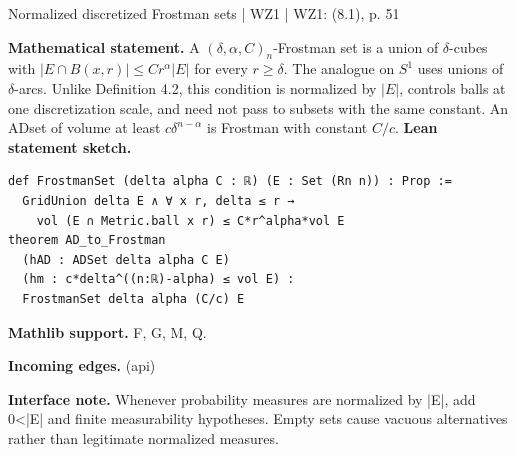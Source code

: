 \documentclass[10pt,a4paper]{article}
\newcommand{\nodecard}[1]{\hyperlink{node-#1}{\texttt{\detokenize{#1}}}}
\begin{document}
\begin{minipage}{\linewidth}
\hypertarget{node-DFrost}{}
\begin{tcolorbox}[colback=white,colframe=radialfg,colbacktitle=radialbg,coltitle=ink,boxrule=0.45pt,arc=1.6mm,left=3mm,right=3mm,top=2mm,bottom=2mm,title={\sffamily\bfseries WZ1 Definition 8.1 \hfill \texttt{DFrost}}]
{\sffamily\small\color{muted}Normalized discretized Frostman sets | WZ1 | WZ1: (8.1), p. 51}\par
\textbf{Mathematical statement.} A $(\delta,\alpha,C)_n$-Frostman set is a union of $\delta$-cubes with
$|E\cap B(x,r)|\le Cr^\alpha |E|$ for every $r\ge\delta$.
The analogue on $S^1$ uses unions of $\delta$-arcs. Unlike Definition 4.2, this condition is normalized by $|E|$, controls balls at one discretization scale, and need not pass to subsets with the same constant.
An ADset of volume at least $c\delta^{n-\alpha}$ is Frostman with constant $C/c$.
\smallskip\textbf{Lean statement sketch.}
\begin{Verbatim}[fontsize=\small,breaklines=true,breakanywhere=true,tabsize=2]
def FrostmanSet (delta alpha C : ℝ) (E : Set (Rn n)) : Prop :=
  GridUnion delta E ∧ ∀ x r, delta ≤ r →
    vol (E ∩ Metric.ball x r) ≤ C*r^alpha*vol E
theorem AD_to_Frostman
  (hAD : ADSet delta alpha C E)
  (hm : c*delta^((n:ℝ)-alpha) ≤ vol E) :
  FrostmanSet delta alpha (C/c) E
\end{Verbatim}
{\footnotesize\textbf{Mathlib support.} F, G, M, Q.\par
\textbf{Incoming edges.} \nodecard{Igeom} (api)\par}
{\footnotesize\textbf{Interface note.} Whenever probability measures are normalized by |E|, add 0<|E| and finite measurability hypotheses. Empty sets cause vacuous alternatives rather than legitimate normalized measures.}
\end{tcolorbox}\end{minipage}\par\medskip
\end{document}

